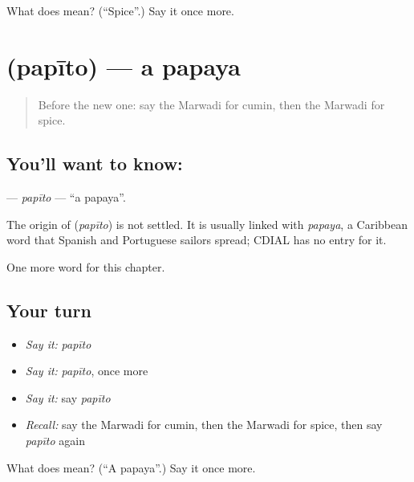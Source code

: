 \begin{tcolorbox}[breakable,colback=teal!4,colframe=teal!35!black,title={Before you move on}]
What does  mean? (\textquotedblleft{}Spice\textquotedblright{}.) Say it once more.
\end{tcolorbox}
\section[\texorpdfstring{\mw{पपीतो} (papīto)}{पपीतो (papīto)}]{ (papīto) — a papaya}

\label{lesson:MW-C137-papito}



\begin{quote}
Before the new one: say the Marwadi for cumin, then the Marwadi for spice.
\end{quote}

\subsection*{You'll want to know: }
\textbf{} — \emph{papīto} — \textquotedblleft{}a papaya\textquotedblright{}.

\begin{cousinweb}
The origin of \textbf{} (\emph{papīto}) is not settled. It is usually linked with \emph{papaya}, a Caribbean word that Spanish and Portuguese sailors spread; CDIAL has no entry for it.
\end{cousinweb}

\begin{grammarlens}[title={What you've built}]
One more word for this chapter.
\end{grammarlens}

\subsection*{Your turn}
\begin{itemize}
\raggedright
  \item \emph{Say it:} \emph{papīto}
  \item \emph{Say it:} \emph{papīto}, once more
  \item \emph{Say it:} say \emph{papīto}
  \item \emph{Recall:} say the Marwadi for cumin, then the Marwadi for spice, then say \emph{papīto} again
\end{itemize}

\begin{tcolorbox}[breakable,colback=teal!4,colframe=teal!35!black,title={Before you move on}]
What does  mean? (\textquotedblleft{}A papaya\textquotedblright{}.) Say it once more.
\end{tcolorbox}
